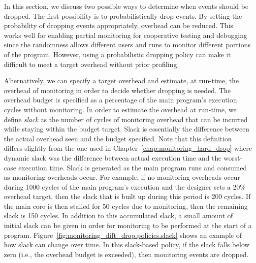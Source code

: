 In this section, we discuss two possible ways to determine when events should
be dropped.  The first possibility is to probabilistically drop events. By
setting the probability of dropping events appropriately, overhead can be
reduced. This works well for enabling partial monitoring for cooperative
testing and debugging since the randomness allows different users and runs to
monitor different portions of the program. However, using a probabilistic
dropping policy can make it difficult to meet a target overhead without prior
profiling.

Alternatively, we can specify a target overhead and estimate, at run-time, the
overhead of monitoring in order to decide whether dropping is needed.  The
overhead budget is specified as a percentage of the main program's execution
cycles without monitoring. In order to estimate the overhead at run-time, we
define \emph{slack} as the number of cycles of monitoring overhead that can be
incurred while staying within the budget target. Slack is essentially the
difference between the actual overhead seen and the budget specified. Note that
this definition differs slightly from the one used in
Chapter~\ref{chap:monitoring_hard_drop} where dynamic slack was the difference
between actual execution time and the worst-case execution time. Slack is
generated as the main program runs and consumed as monitoring overheads occur.
For example, if no monitoring overheads occur during 1000 cycles of the main
program's execution and the designer sets a 20\% overhead target, then the
slack that is built up during this period is 200 cycles. If the main core is
then stalled for 50 cycles due to monitoring, then the remaining slack is 150
cycles.  In addition to this accumulated slack, a small amount of initial slack
can be given in order for monitoring to be performed at the start of a program.
Figure~\ref{fig:monitoring_dift_drop.policies.slack} shows an example of how
slack can change over time.  In this slack-based policy, if the slack falls
below zero (i.e., the overhead budget is exceeded), then monitoring events are
dropped.

